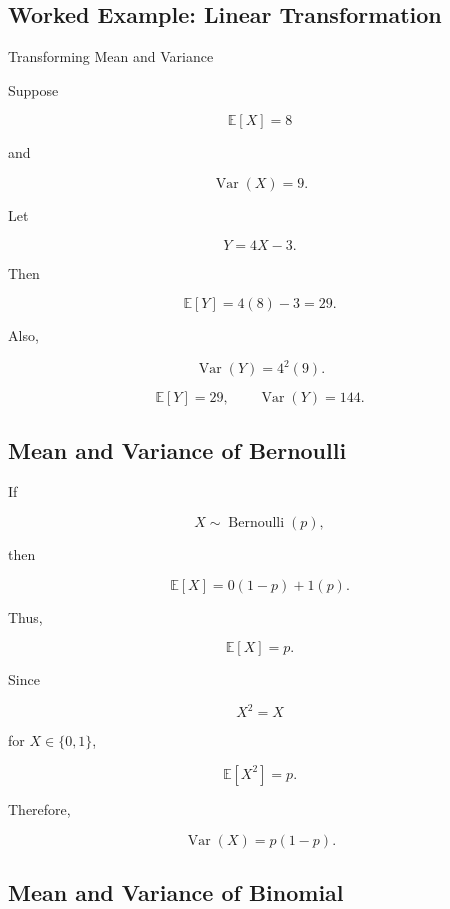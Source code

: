 \subsection{Worked Example: Linear Transformation}
\label{subsec:worked-linear-variance}

\begin{workedexamplebox}{Transforming Mean and Variance}

Suppose

\[
\mathbb{E}[X]=8
\]

and

\[
\operatorname{Var}(X)=9.
\]

Let

\[
Y=4X-3.
\]

Then

\[
\mathbb{E}[Y]
=
4(8)-3
=
29.
\]

Also,

\[
\operatorname{Var}(Y)
=
4^2(9).
\]

\begin{answerbox}
\[
\boxed{
\mathbb{E}[Y]=29,
\qquad
\operatorname{Var}(Y)=144.
}
\]
\end{answerbox}

\end{workedexamplebox}

\subsection{Mean and Variance of Bernoulli}
\label{subsec:bernoulli-mean-variance}

If

\[
X\sim\operatorname{Bernoulli}(p),
\]

then

\[
\mathbb{E}[X]
=
0(1-p)+1(p).
\]

Thus,

\[
\boxed{
\mathbb{E}[X]=p.
}
\]

Since

\[
X^2=X
\]

for \(X\in\{0,1\}\),

\[
\mathbb{E}[X^2]=p.
\]

Therefore,

\[
\boxed{
\operatorname{Var}(X)
=
p(1-p).
}
\]

\subsection{Mean and Variance of Binomial}
\label{subsec:binomial-mean-variance}

